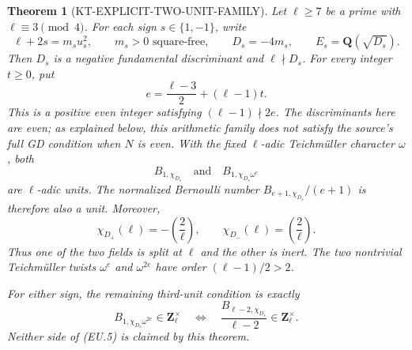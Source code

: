 \documentclass[11pt,a4paper]{article}
\newtheorem{theorem}{Theorem}[section]
\theoremstyle{definition}
\begin{document}
\begin{theorem}[KT-EXPLICIT-TWO-UNIT-FAMILY]
Let $\ell\geq7$ be a prime with $\ell\equiv3\pmod4$.  For each sign
$s\in\{1,-1\}$, write
\[
 \ell+2s=m_su_s^2,\qquad m_s>0\text{ square-free},\qquad
 D_s=-4m_s,\qquad E_s=\mathbf Q(\sqrt{D_s}).                 \tag{EU.1}
\]
Then $D_s$ is a negative fundamental discriminant and $\ell\nmid D_s$.
For every integer $t\geq0$, put
\[
 e=\frac{\ell-3}{2}+(\ell-1)t.                              \tag{EU.2}
\]
This is a positive even integer satisfying $(\ell-1)\nmid2e$.
The discriminants here are even; as explained below, this arithmetic
family does not satisfy the source's full GD condition when $N$ is even.
With the fixed $\ell$-adic Teichm\"uller character $\omega$, both
\[
 B_{1,\chi_{D_s}}\quad\text{and}\quad
 B_{1,\chi_{D_s}\omega^e}
                                                               \tag{EU.3}
\]
are $\ell$-adic units.  The normalized Bernoulli number
$B_{e+1,\chi_{D_s}}/(e+1)$ is therefore also a unit.
Moreover,
\[
 \chi_{D_+}(\ell)=-\left(\frac2\ell\right),\qquad
 \chi_{D_-}(\ell)= \left(\frac2\ell\right).                 \tag{EU.4}
\]
Thus one of the two fields is split at $\ell$ and the other is inert.
The two nontrivial Teichm\"uller twists $\omega^e$ and $\omega^{2e}$
have order $(\ell-1)/2>2$.

For either sign, the remaining third-unit condition is exactly
\[
 B_{1,\chi_{D_s}\omega^{2e}}\in\mathbf Z_\ell^\times
 \quad\Longleftrightarrow\quad
 \frac{B_{\ell-2,\chi_{D_s}}}{\ell-2}\in\mathbf Z_\ell^\times.
                                                               \tag{EU.5}
\]
Neither side of (EU.5) is claimed by this theorem.
\end{theorem}
\end{document}
